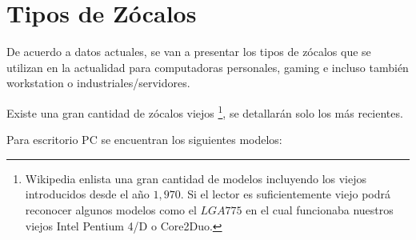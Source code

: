 \documentclass[conference]{IEEEtran}
\begin{document}
\section{Tipos de Zócalos}

De acuerdo a datos actuales, se van a presentar los tipos de zócalos que se utilizan en la actualidad para computadoras personales, gaming e incluso también workstation o industriales/servidores.

\bigbreak

Existe una gran cantidad de zócalos viejos \footnote{Wikipedia \cite{wikipedia-contributors-2022} enlista una gran cantidad de modelos incluyendo los viejos introducidos desde el año $1,970$. Si el lector es suficientemente viejo podrá reconocer algunos modelos como el $LGA 775$ en el cual funcionaba nuestros viejos Intel Pentium 4/D o Core2Duo.}, se detallarán solo los más recientes.

\bigbreak

Para escritorio PC se encuentran los siguientes modelos:
\end{document}
